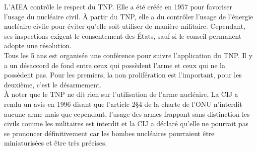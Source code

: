 \documentclass[10pt, a4paper, openany]{book}
\begin{document}
L'AIEA contrôle le respect du TNP. Elle a été créée en 1957 pour favoriser l'usage du nucléaire civil. À partir du TNP, elle a du contrôler l'usage de l'énergie nucléaire civile pour éviter qu'elle soit utiliser de manière militaire. Cependant, ses inspections exigent le consentement des États, sauf si le conseil permanent adopte une résolution. \\
Tous les 5 ans est organisée une conférence pour suivre l'application du TNP. Il y a un désaccord de fond entre ceux qui possèdent l'arme et ceux qui ne la possèdent pas. Pour les premiers, la non prolifération est l'important, pour les deuxième, c'est le désarmement. \\
À noter que le TNP ne dit rien sur l'utilisation de l'arme nucléaire. La CIJ a rendu un avis en 1996 disant que l'article 2§4 de la charte de l'ONU n'interdit aucune arme mais que cependant, l'usage des armes frappant sans distinction les civils comme les militaires est interdit et la CIJ a déclaré qu'elle ne pourrait pas se prononcer définitivement car les bombes nucléaires pourraient être miniaturisées et être très précises. 
\end{document}
